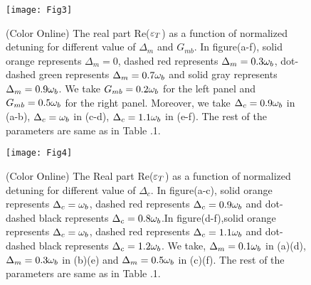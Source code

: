 \documentclass[aps,pra,superscriptaddress,balancelastpage,twocolumn]{revtex4}
\begin{document}
\begin{figure}[b!]
\begin{center}
\texttt{[image: Fig3]}
\end{center}
\caption{(Color Online) The real part Re($\protect\varepsilon _{T}$) as a
function of normalized detuning for different value of $\Delta _{m}$ and $%
G_{mb}$. In figure(a-f), solid orange represents $\Delta _{m}=0$, dashed red
represents $\Delta _{m}=0.3\protect\omega _{b}$, dot-dashed green represents
$\Delta _{m}=0.7\protect\omega _{b}$ and solid gray represents $\Delta
_{m}=0.9\protect\omega _{b}$. We take $G_{mb}=0.2\protect\omega _{b}$ for
the left panel and $G_{mb}=0.5\protect\omega _{b}$ for the right panel.
Moreover, we take $\Delta _{c}=0.9\protect\omega _{b}$ in (a-b), $\Delta
_{c}=\protect\omega _{b}$ in (c-d), $\Delta _{c}=1.1\protect\omega _{b}$ in
(e-f). The rest of the parameters are same as in Table .1.}
\end{figure}
\begin{figure*}[tbp]
\begin{center}
\texttt{[image: Fig4]}
\end{center}
\caption{(Color Online) The Real part Re($\protect\varepsilon_{T}$) as a
function of normalized detuning for different value of $\Delta_{c}$. In
figure(a-c), solid orange represents $\Delta_{c}=\protect\omega_{b}$, dashed
red represents $\Delta_{c}=0.9\protect\omega_{b}$ and dot-dashed black
represents $\Delta_{c}=0.8\protect\omega_{b}$.In figure(d-f),solid orange
represents $\Delta_{c}=\protect\omega_{b}$, dashed red represents $%
\Delta_{c}=1.1\protect\omega_{b}$ and dot-dashed black represents $%
\Delta_{c}=1.2\protect\omega_{b}$. We take, $\Delta_{m}=0.1\protect\omega%
_{b} $ in (a)(d), $\Delta_{m}=0.3\protect\omega_{b}$ in (b)(e) and $%
\Delta_{m}=0.5\protect\omega_{b}$ in (c)(f). The rest of the parameters are
same as in Table .1.}
\end{figure*}
\end{document}
